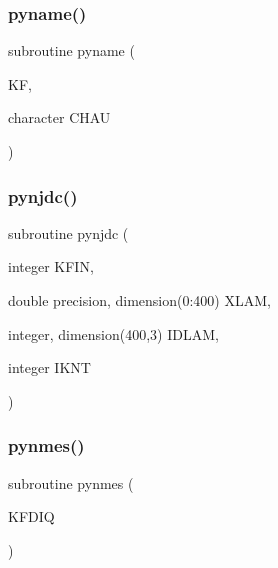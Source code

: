 \mbox{\label{pythia-6_84_824_8f_ab0dbe916b7d36854c02faf180f41d585}} 
\subsubsection{\texorpdfstring{pyname()}{pyname()}}
{\footnotesize\ttfamily subroutine pyname (\begin{DoxyParamCaption}\item[{}]{KF,  }\item[{character}]{C\+H\+AU }\end{DoxyParamCaption})}

\mbox{\label{pythia-6_84_824_8f_a4eb734124cd851ea27210387798a8ad9}} 
\subsubsection{\texorpdfstring{pynjdc()}{pynjdc()}}
{\footnotesize\ttfamily subroutine pynjdc (\begin{DoxyParamCaption}\item[{integer}]{K\+F\+IN,  }\item[{double precision, dimension(0\+:400)}]{X\+L\+AM,  }\item[{integer, dimension(400,3)}]{I\+D\+L\+AM,  }\item[{integer}]{I\+K\+NT }\end{DoxyParamCaption})}

\mbox{\label{pythia-6_84_824_8f_a489aaca35db439fe8d6a80cddc152851}} 
\subsubsection{\texorpdfstring{pynmes()}{pynmes()}}
{\footnotesize\ttfamily subroutine pynmes (\begin{DoxyParamCaption}\item[{}]{K\+F\+D\+IQ }\end{DoxyParamCaption})}

